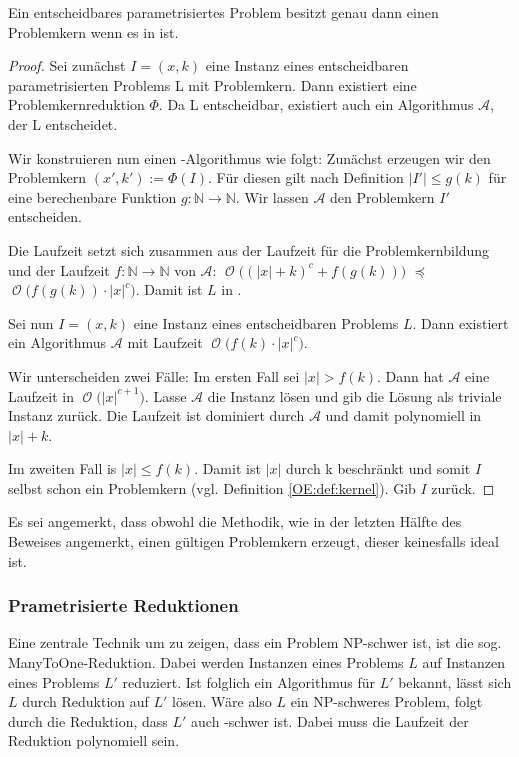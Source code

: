 \documentclass[a4paper,ngerman]{atseminar}
\newcommand{\N}{\ensuremath{\mathbb{N}}\xspace}
\renewcommand{\A}{\ensuremath{\mathcal{A}}\xspace}
\newcommand{\BigO}[1]{\ensuremath{\operatorname{\mathcal{O}}\bigl(#1\bigr)}\xspace}
\begin{document}
\begin{theorem}
  Ein entscheidbares parametrisiertes Problem besitzt genau dann einen Problemkern wenn es in \FPT ist.
\end{theorem}
\begin{proof}
    Sei zunächst $I = (x, k)$ eine Instanz eines entscheidbaren parametrisierten Problems L mit Problemkern. Dann existiert eine Problemkernreduktion
    $\Phi$. Da L entscheidbar, existiert auch ein Algorithmus \A, der L entscheidet.
  
    \noindent
    Wir konstruieren nun einen \FPT-Algorithmus wie folgt:
    Zunächst erzeugen wir den Problemkern $(x', k') := \Phi(I)$. Für diesen gilt nach Definition $|I'| \leq g(k)$ für eine berechenbare Funktion
    $g: \N \rightarrow \N$. Wir lassen \A den Problemkern $I'$ entscheiden.
  
    \noindent
    Die Laufzeit setzt sich zusammen aus der Laufzeit für die Problemkernbildung und der Laufzeit $f: \N \rightarrow \N$ von \A:
    \BigO{(|x| + k)^c + f(g(k))} $\preceq$ \BigO{f(g(k)) \cdot |x|^c}. 
    Damit ist $L$ in \FPT.

    \vspace{0.25cm}
    \noindent
    Sei nun $I = (x, k)$ eine Instanz eines entscheidbaren \FPT\xspace Problems $L$.
    Dann existiert ein Algorithmus \A mit Laufzeit \BigO{f(k) \cdot |x|^c}.

    \noindent
    Wir unterscheiden zwei Fälle:
    Im ersten Fall sei $|x| > f(k)$. Dann hat \A eine Laufzeit in \BigO{|x|^{c+1}}. Lasse \A die Instanz lösen und gib die Lösung
    als triviale Instanz zurück. Die Laufzeit ist dominiert durch \A und damit polynomiell in $|x| + k$.
    
    \noindent
    Im zweiten Fall is $|x| \leq f(k)$. Damit ist $|x|$ durch k beschränkt und somit $I$ selbst schon ein Problemkern (vgl. Definition \ref{OE:def:kernel}).
    Gib $I$ zurück.
  \end{proof}

  Es sei angemerkt, dass obwohl die Methodik, wie in der letzten Hälfte des Beweises angemerkt, einen gültigen Problemkern erzeugt, dieser
  keinesfalls ideal ist.

\subsubsection{Prametrisierte Reduktionen}

Eine zentrale Technik um zu zeigen, dass ein Problem NP-schwer ist,
ist die sog. ManyToOne-Reduktion.
Dabei werden Instanzen eines Problems $L$ auf Instanzen eines Problems $L'$ reduziert.
Ist folglich ein Algorithmus für $L'$ bekannt, lässt sich $L$ durch Reduktion auf $L'$ lösen.
Wäre also $L$ ein NP-schweres Problem, folgt durch die Reduktion, dass $L'$ auch \NP-schwer ist.
Dabei muss die Laufzeit der Reduktion polynomiell sein.
\end{document}
